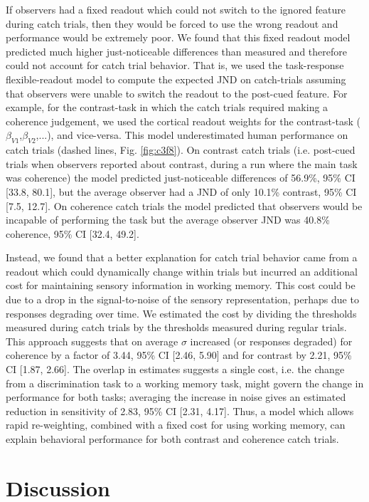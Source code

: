 If observers had a fixed readout which could not switch to the ignored feature during catch trials, then they would be forced to use the wrong readout and performance would be extremely poor. We found that this fixed readout model predicted much higher just-noticeable differences than measured and therefore could not account for catch trial behavior. That is, we used the task-response flexible-readout model to compute the expected JND on catch-trials assuming that observers were unable to switch the readout to the post-cued feature. For example, for the contrast-task in which the catch trials required making a coherence judgement, we used the cortical readout weights for the contrast-task ($\beta_{V1}$,$\beta_{V2}$,...), and vice-versa. This model underestimated human performance on catch trials (dashed lines, Fig. \ref{fig:c3f8}). On contrast catch trials (i.e. post-cued trials when observers reported about contrast, during a run where the main task was coherence) the model predicted just-noticeable differences of 56.9\%, 95\% CI [33.8, 80.1], but the average observer had a JND of only 10.1\% contrast, 95\% CI [7.5, 12.7]. On coherence catch trials the model predicted that observers would be incapable of performing the task but the average observer JND was 40.8\% coherence, 95\% CI [32.4, 49.2]. 

Instead, we found that a better explanation for catch trial behavior came from a readout which could dynamically change within trials but incurred an additional cost for maintaining sensory information in working memory. This cost could be due to a drop in the signal-to-noise of the sensory representation, perhaps due to responses degrading over time. We estimated the cost by dividing the thresholds measured during catch trials by the thresholds measured during regular trials. This approach suggests that on average $\sigma$ increased (or responses degraded) for coherence by a factor of 3.44, 95\% CI [2.46, 5.90] and for contrast by 2.21, 95\% CI [1.87, 2.66]. The overlap in estimates suggests a single cost, i.e. the change from a discrimination task to a working memory task, might govern the change in performance for both tasks; averaging the increase in noise gives an estimated reduction in sensitivity of 2.83, 95\% CI [2.31, 4.17]. Thus, a model which allows rapid re-weighting, combined with a fixed cost for using working memory, can explain behavioral performance for both contrast and coherence catch trials.

\section{Discussion}

